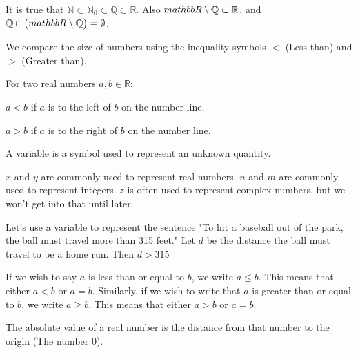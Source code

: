 \documentclass[crop=false,class=article,oneside]{standalone}
\begin{document}
        \begin{remark}
            It is true that
            $\mathbb{N}\subset\mathbb{N}_{0}\subset\mathbb{Q}\subset\mathbb{R}$.
            Also $\\mathbb{R}\setminus\mathbb{Q}\subset\mathbb{R}$, and
            $\mathbb{Q}\cap\big(\\mathbb{R}\setminus\mathbb{Q}\big)=\emptyset$.
        \end{remark}
        We compare the size of numbers using the inequality symbols $<$ (Less than) and $>$ (Greater than).
        \begin{properties}
        For two real numbers $a,b\in \mathbb{R}$:
        \begin{enumerate}
        \begin{multicols}{2}
        \item $a<b$ if $a$ is to the left of $b$ on the number line.
        \item $a>b$ if $a$ is to the right of $b$ on the number line.
        \end{multicols}
        \end{enumerate}
        \end{properties}
        \begin{definition}
        A variable is a symbol used to represent an unknown quantity.
        \end{definition}
        \begin{example}
        $x$ and $y$ are commonly used to represent real numbers. $n$ and $m$ are commonly used to represent integers. $z$ is often used to represent complex numbers, but we won't get into that until later.
        \end{example}
        \begin{example}
        Let's use a variable to represent the sentence "To hit a baseball out of the park, the ball must travel more than 315 feet." Let $d$ be the distance the ball must travel to be a home run. Then $d>315$
        \end{example}
        \begin{notation}
        If we wish to say $a$ is less than or equal to $b$, we write $a\leq b$. This means that either $a<b$ or $a=b$. Similarly, if we wish to write that $a$ is greater than or equal to $b$, we write $a\geq b$. This means that either $a>b$ or $a=b$.
        \end{notation}
        The absolute value of a real number is the distance from that number to the origin (The number $0$).
\end{document}
